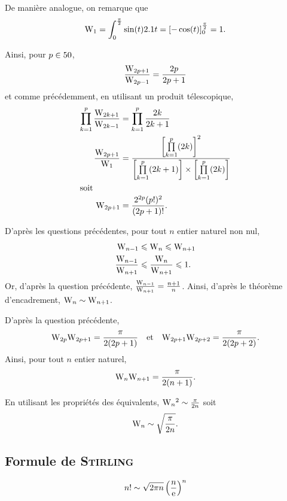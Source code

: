 \begin{solution}
\begin{reponses}
\item De manière analogue, on remarque que
\[
\mathrm{W}_1
= \int_0^{\frac{\pi}{2}} \sin(t) 2.1 t
= \left[-\cos(t)\right]_0^{\frac{\pi}{2}}
= 1.
\]

Ainsi, pour $p \in 50$,
\[
\frac{\mathrm{W}_{2p+1}}{\mathrm{W}_{2p-1}} = \frac{2p}{2p+1}
\]
et comme précédemment, en utilisant un produit télescopique, 
\begin{align*}
\prod_{k=1}^p \frac{\mathrm{W}_{2k+1}}{\mathrm{W}_{2k-1}} &= \prod_{k=1}^p \frac{2k}{2k+1}\\
\frac{\mathrm{W}_{2p+1}}{\mathrm{W}_1} &= \frac{\left[\prod\limits_{k=1}^p (2k)\right]^2}{\left[\prod\limits_{k=1}^p (2k+1)\right] \times \left[\prod\limits_{k=1}^p (2k)\right]}\\
\intertext{soit}
\mathrm{W}_{2p+1} &= \frac{2^{2p} (p!)^2}{(2p+1)!}.
\end{align*}

\item D'après les questions précédentes, pour tout $n$ entier naturel non nul,
\begin{align*}
\mathrm{W}_{n-1} &\leqslant \mathrm{W}_n \leqslant \mathrm{W}_{n+1}\\
\frac{\mathrm{W}_{n-1}}{\mathrm{W}_{n+1}} &\leqslant \frac{\mathrm{W}_n}{\mathrm{W}_{n+1}} \leqslant 1.
\end{align*}
Or, d'après la question précédente, $\frac{\mathrm{W}_{n-1}}{\mathrm{W}_{n+1}} = \frac{n+1}{n}$. Ainsi, d'après le théorème d'encadrement, $\mathrm{W}_n \sim \mathrm{W}_{n+1}$.

\item D'après la question précédente,
\[
\mathrm{W}_{2p} \mathrm{W}_{2p+1} = \frac{\pi}{2 (2 p + 1)}
\quad \text{et} \quad
\mathrm{W}_{2p+1} \mathrm{W}_{2p+2} = \frac{\pi}{2 (2p+2)}.
\]
Ainsi, pour tout $n$ entier naturel,
\[
\mathrm{W}_n \mathrm{W}_{n+1} = \frac{\pi}{2 (n + 1)}.
\]

\item En utilisant les propriétés des équivalents, $\mathrm{W}_n{}^2 \sim \frac{\pi}{2 n}$ soit
\[
\mathrm{W}_n \sim \sqrt{\frac{\pi}{2 n}}.
\]
\end{reponses}
\end{solution}

\subsection{Formule de \textsc{Stirling}} \label{preuve_stirling}


\begin{theo}
\[
n! \sim \sqrt{2 \pi n} \left(\frac{n}{\mathrm{e}}\right)^n
\]
\end{theo}

